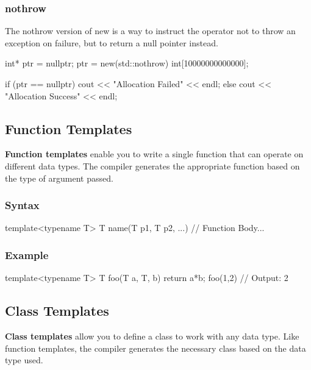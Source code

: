 \documentclass{report}
\begin{document}
\begin{concept}
    \bigbreak \noindent 
    \subsubsection{nothrow}
    \bigbreak \noindent 
    The nothrow version of new is a way to instruct the operator not to throw an exception on failure, but to return a null pointer instead.
    \bigbreak \noindent 
    \begin{cppcode}
        int* ptr = nullptr;
        ptr = new(std::nothrow) int[10000000000000];

        if (ptr == nullptr) {
            cout << "Allocation Failed" << endl;
        } else {
            cout << "Allocation Success" << endl;
        }
    \end{cppcode}

    \pagebreak 
    \bigbreak \noindent 
    \subsection{Function Templates}
    \bigbreak \noindent 
    \begin{concept}
        \textbf{Function templates} enable you to write a single function that can operate on different data types. The compiler generates the appropriate function based on the type of argument passed.
    \end{concept}
    \bigbreak \noindent 
    \subsubsection{Syntax}
    \bigbreak \noindent 
    \begin{cppcode}
    template<typename T>
    T name(T p1, T p2, ...) {
        // Function Body...
    }
    \end{cppcode}

    \bigbreak \noindent 
    \subsubsection{Example}
    \bigbreak \noindent 
    \begin{cppcode}
    template<typename T>
    T foo(T a, T, b) {
        return a*b;
    }
    foo(1,2) // Output: 2
    \end{cppcode}


    \pagebreak 
    \subsection{Class Templates}
    \bigbreak \noindent 
    \begin{concept}
        \textbf{Class templates} allow you to define a class to work with any data type. Like function templates, the compiler generates the necessary class based on the data type used.
    \end{concept}
    \bigbreak \noindent 

\end{concept}
\end{document}
